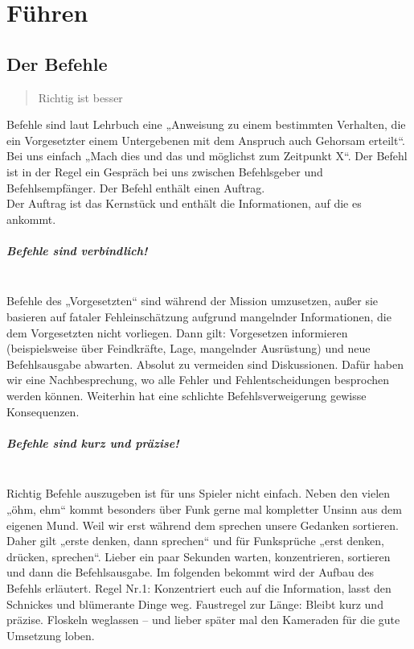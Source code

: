\chapter{Führen}
\section{Der Befehle}
\label{subsec:befehl}
\begin{quote}
	\glqq Richtig ist besser\grqq
\end{quote}
Befehle sind laut Lehrbuch eine „Anweisung zu einem bestimmten Verhalten, die ein Vorgesetzter einem Untergebenen mit dem Anspruch auch Gehorsam erteilt“. Bei uns einfach „Mach dies und das und möglichst zum Zeitpunkt X“. Der Befehl ist in der Regel ein Gespräch bei uns zwischen Befehlsgeber und Befehlsempfänger. Der Befehl enthält einen Auftrag.\\
Der Auftrag ist das Kernstück und enthält die Informationen, auf die es ankommt.

\paragraph*{Befehle sind verbindlich!}\hfil\\
Befehle des „Vorgesetzten“ sind während der Mission umzusetzen, außer sie basieren auf fataler Fehleinschätzung aufgrund mangelnder Informationen, die dem Vorgesetzten nicht vorliegen. Dann gilt: Vorgesetzen informieren (beispielsweise über Feindkräfte, Lage, mangelnder Ausrüstung) und neue Befehlsausgabe abwarten. Absolut zu vermeiden sind Diskussionen. Dafür haben wir eine Nachbesprechung, wo alle Fehler und Fehlentscheidungen besprochen werden können. Weiterhin hat eine schlichte Befehlsverweigerung gewisse Konsequenzen.

\paragraph*{Befehle sind kurz und präzise!}\hfil\\
Richtig Befehle auszugeben ist für uns Spieler nicht einfach. 
Neben den vielen „öhm, ehm“ kommt besonders über Funk gerne mal kompletter Unsinn aus dem eigenen Mund. 
Weil wir erst während dem sprechen unsere Gedanken sortieren. 
Daher gilt „erste denken, dann sprechen“ und für Funksprüche „erst denken, drücken, sprechen“. Lieber ein paar Sekunden warten, konzentrieren, sortieren und dann die Befehlsausgabe.
Im folgenden bekommt wird der Aufbau des Befehls erläutert. Regel Nr.1: Konzentriert euch auf die Information, lasst den Schnickes und blümerante Dinge weg.
Faustregel zur Länge: Bleibt kurz und präzise. Floskeln weglassen -- und lieber später mal den Kameraden für die gute Umsetzung loben. 

